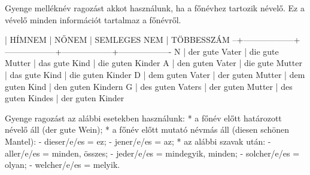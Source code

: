 \documentclass{article}
\newenvironment{desc}{\verbatim}{\endverbatim}
\begin{document}
\begin{desc}
Gyenge melléknév ragozást akkot használunk, ha a főnévhez tartozik névelő. Ez a vévelő minden információt tartalmaz a főnévről.

  | HÍMNEM           | NŐNEM            | SEMLEGES NEM     | TÖBBESSZÁM
--+------------------+------------------+------------------+-------------------
N | der gute Vater   | die gute Mutter  | das gute Kind    | die guten Kinder
A | den guten Vater  | die gute Mutter  | das gute Kind    | die guten Kinder
D | dem guten Vater  | der guten Mutter | dem guten Kind   | den guten Kindern
G | des guten Vaters | der guten Mutter | des guten Kindes | der guten Kinder

Gyenge ragozást az alábbi esetekben használunk:
* a főnév előtt határozott névelő áll (der gute Wein);
* a főnév előtt mutató névmás áll (diesen schönen Mantel):
  - dieser/e/es = ez;
  - jener/e/es = az;
* az alábbi szavak után:
  - aller/e/es = minden, összes;
  - jeder/e/es = mindegyik, minden;
  - solcher/e/es = olyan;
  - welcher/e/es = melyik.
\end{desc}
\end{document}
